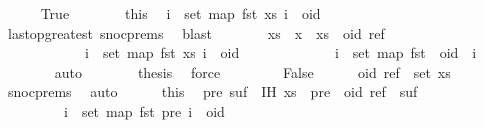 \begin{isabellebody}
\ \ \ \ \isamarkupfalse%
\ True\isanewline
\ \ \ \ \isamarkupfalse%
\ \isamarkupfalse%
\ this\ \isamarkupfalse%
\ {\isachardoublequoteopen}{\isasymforall}i\ {\isasymin}\ set\ {\isacharparenleft}map\ fst\ xs{\isacharparenright}{\isachardot}\ i\ {\isacharless}\ oid{\isachardoublequoteclose}\isanewline
\ \ \ \ \ \ \isamarkupfalse%
\ last{\isacharunderscore}op{\isacharunderscore}greatest\ snoc{\isachardot}prems{\isacharparenleft}{}{\isacharparenright}\ \isamarkupfalse%
\ blast\isanewline
\ \ \ \ \isamarkupfalse%
\ \isamarkupfalse%
\ {\isachardoublequoteopen}xs\ {\isacharat}\ {\isacharbrackleft}x{\isacharbrackright}\ {\isacharequal}\ xs\ {\isacharat}\ {\isacharbrackleft}{\isacharparenleft}oid{\isacharcomma}\ ref{\isacharparenright}{\isacharbrackright}\ {\isacharat}\ {\isacharbrackleft}{\isacharbrackright}\ {\isasymand}\isanewline
\ \ \ \ \ \ \ \ \ \ \ \ {\isacharparenleft}{\isasymforall}i\ {\isasymin}\ set\ {\isacharparenleft}map\ fst\ xs{\isacharparenright}{\isachardot}\ i\ {\isacharless}\ oid{\isacharparenright}\ {\isasymand}\isanewline
\ \ \ \ \ \ \ \ \ \ \ \ {\isacharparenleft}{\isasymforall}i\ {\isasymin}\ set\ {\isacharparenleft}map\ fst\ {\isacharbrackleft}{\isacharbrackright}{\isacharparenright}{\isachardot}\ oid\ {\isacharless}\ i{\isacharparenright}{\isachardoublequoteclose}\isanewline
\ \ \ \ \ \ \isamarkupfalse%
\ auto\isanewline
\ \ \ \ \isamarkupfalse%
\ \isamarkupfalse%
\ {\isacharquery}thesis\ \isamarkupfalse%
\ force\isanewline
\ \ \isamarkupfalse%
\isanewline
\ \ \ \ \isamarkupfalse%
\ False\isanewline
\ \ \ \ \isamarkupfalse%
\ {\isachardoublequoteopen}{\isacharparenleft}oid{\isacharcomma}\ ref{\isacharparenright}\ {\isasymin}\ set\ xs{\isachardoublequoteclose}\isanewline
\ \ \ \ \ \ \isamarkupfalse%
\ snoc{\isachardot}prems{\isacharparenleft}{}{\isacharparenright}\ \isamarkupfalse%
\ auto\isanewline
\ \ \ \ \isamarkupfalse%
\ this\ \isamarkupfalse%
\ pre\ suf\ \ IH{\isacharcolon}\ {\isachardoublequoteopen}xs\ {\isacharequal}\ pre\ {\isacharat}\ {\isacharbrackleft}{\isacharparenleft}oid{\isacharcomma}\ ref{\isacharparenright}{\isacharbrackright}\ {\isacharat}\ suf\ {\isasymand}\isanewline
\ \ \ \ \ \ \ \ \ {\isacharparenleft}{\isasymforall}i\ {\isasymin}\ set\ {\isacharparenleft}map\ fst\ pre{\isacharparenright}{\isachardot}\ i\ {\isacharless}\ oid{\isacharparenright}\ {\isasymand}\isanewline

\end{isabellebody}

